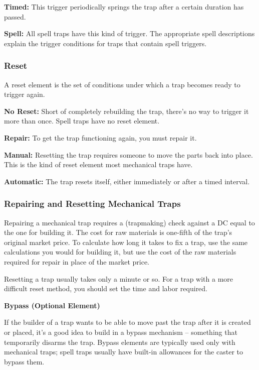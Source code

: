 \textbf{Timed:} This trigger periodically springs the trap after a certain duration 
has passed.

\textbf{Spell:} All spell traps have this kind of trigger. The appropriate spell 
descriptions explain the trigger conditions for traps that contain spell 
triggers.

\subsubsection{Reset}

A reset element is the set of conditions under which a trap becomes ready to trigger 
again.

\textbf{No Reset:} Short of completely rebuilding the trap, there's no way to trigger 
it more than once. Spell traps have no reset element. 

\textbf{Repair:} To get the trap functioning again, you must repair it. 

\textbf{Manual:} Resetting the trap requires someone to move the parts back into 
place. This is the kind of reset element most mechanical traps have.

\textbf{Automatic:} The trap resets itself, either immediately or after a timed 
interval.

\subsubsection{Repairing and Resetting Mechanical Traps}

Repairing a mechanical trap requires a  (trapmaking) check against a DC equal 
to the one for building it. The cost for raw materials is one-fifth of the trap's 
original market price. To calculate how long it takes to fix a trap, use the same 
calculations you would for building it, but use the cost of the raw materials required 
for repair in place of the market price.

Resetting a trap usually takes only a minute or so. For a trap with a more difficult 
reset method, you should set the time and labor required.

\vspace{12pt}
\textbf{Bypass (Optional Element)}

If the builder of a trap wants to be able to move past the trap after it is created 
or placed, it's a good idea to build in a bypass mechanism -- something that temporarily 
disarms the trap. Bypass elements are typically used only with mechanical traps; 
spell traps usually have built-in allowances for the caster to bypass them.

